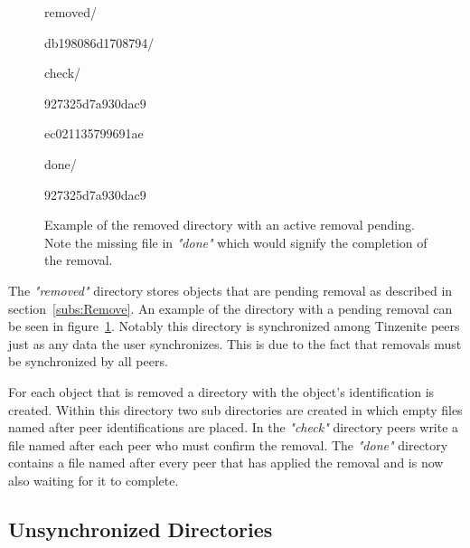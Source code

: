 \begin{figure}[htp]
\begin{modellist}
\item removed/
\begin{modellist}
    \item db198086d1708794/
    \begin{modellist}
        \item check/
        \begin{modellist}
            \item 927325d7a930dac9
            \item ec021135799691ae
        \end{modellist}
        \item done/
        \begin{modellist}
            \item 927325d7a930dac9
        \end{modellist}
    \end{modellist}
\end{modellist}
\end{modellist}
\caption[Removed Folder Structure]{Example of the removed directory with an active removal pending. Note the missing file in \textit{"done"} which would signify the completion of the removal.}
\label{list:removed_folder}
\end{figure}

The \textit{"removed"} directory stores objects that are pending removal as described in section~\ref{subs:Remove}.
An example of the directory with a pending removal can be seen in figure~\ref{list:removed_folder}.
Notably this directory is synchronized among Tinzenite peers just as any data the user synchronizes.
This is due to the fact that removals must be synchronized by all peers.

For each object that is removed a directory with the object's identification is created.
Within this directory two sub directories are created in which empty files named after peer identifications are placed.
In the \textit{"check"} directory peers write a file named after each peer who must confirm the removal.
The \textit{"done"} directory contains a file named after every peer that has applied the removal and is now also waiting for it to complete.

\subsection{Unsynchronized Directories}
\label{sub:Unsynchronized Directories}

